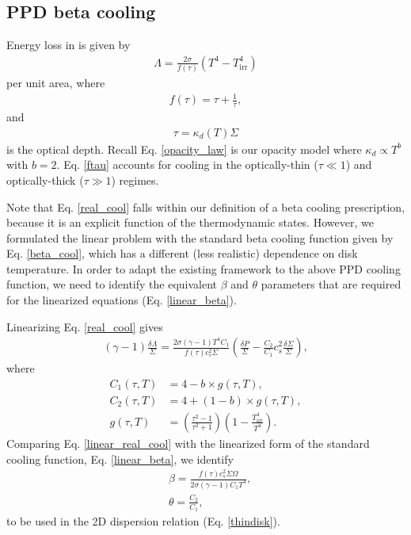 \subsection{PPD beta cooling}\label{ppd_cooling}
Energy loss in  is given by 
\begin{align}\label{real_cool}
  \Lambda = \frac{2\sigma}{f(\tau)}\left(T^4 - T_\mathrm{irr}^4\right)
\end{align}
per unit area, where
\begin{align}
  f(\tau) = \tau + \frac{1}{\tau}, \label{ftau} 
\end{align}
and
\begin{align}
  \tau = \kappa_d(T)\Sigma
\end{align}
is the optical depth. Recall Eq. \ref{opacity_law} 
is our opacity model where $\kappa_d\propto T^b$ with $b=2$. 
Eq. \ref{ftau} accounts for cooling in the optically-thin ($\tau\ll
1$) and optically-thick ($\tau\gg1$) regimes. 

Note that Eq. \ref{real_cool} falls within our definition of a beta cooling prescription, because
it is an explicit function of the thermodynamic states. However, we
formulated the linear problem with the standard beta cooling function 
given by Eq. \ref{beta_cool}, which has a different (less realistic) dependence on disk temperature.
 In order to adapt the existing  framework to the above PPD cooling function, we 
need to identify the equivalent $\beta$ and $\theta$ parameters that are required for the 
linearized equations (Eq. \ref{linear_beta}). 
 

Linearizing Eq. \ref{real_cool} gives   
\begin{align}\label{linear_real_cool}
  (\gamma-1)\frac{\delta\Lambda}{\Sigma} = \frac{2\sigma(\gamma-1)
    T^4C_1}{f(\tau)c_{s}^2\Sigma}\left(\frac{\delta P}{\Sigma} -
  \frac{C_2}{C_1}c_{s}^2\frac{\delta\Sigma}{\Sigma}\right), 
\end{align}
where
\begin{align}
C_1(\tau, T) &= 4 - b\times g(\tau, T),\\ 
C_2(\tau, T) &= 4 + (1-b)\times g(\tau, T),\\ 
  g(\tau, T) &= \left( \frac{\tau^2-1}{\tau^2+1}\right)\left(1 -
  \frac{T_\mathrm{irr}^4}{T^4}\right). \label{g_def}
\end{align}
Comparing Eq. \ref{linear_real_cool} with the linearized form of the
standard cooling function, Eq. \ref{linear_beta}, we identify
\begin{align}
  &\beta = \frac{f(\tau)c_s^2\Sigma\Omega}{2\sigma(\gamma-1)C_1T^4},\label{real_beta}\\
  &\theta = \frac{C_2}{C_1},\label{real_theta} 
\end{align}
to be used in the 2D dispersion relation (Eq. \ref{thindisk}). 

